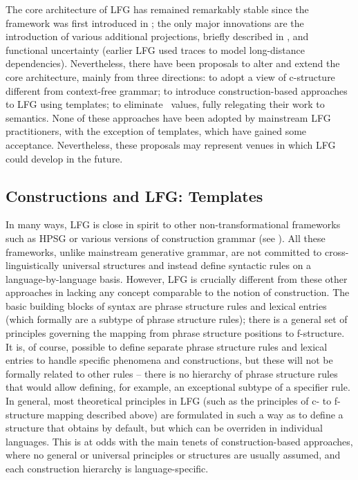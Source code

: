 \documentclass[output=paper,hidelinks]{langscibook}
\begin{document}
 The core architecture of LFG has remained remarkably stable since the framework was first introduced in \textcite{bresnan1982control-complementation}; the only major innovations are the introduction of various additional projections, briefly described in , and functional uncertainty (earlier LFG used traces to model long-distance dependencies). Nevertheless, there have been proposals to alter and extend the core architecture, mainly from three directions: to adopt a view of c-structure different from context-free grammar; to introduce construction-based approaches to LFG using templates; to eliminate \PRED\ values, fully relegating their work to semantics. None of these approaches have been adopted by mainstream LFG practitioners, with the exception of templates, which have gained some acceptance. Nevertheless, these proposals may represent venues in which LFG could develop in the future.

 \subsection{Constructions and LFG: Templates}\label{sec:CoreConcepts:templates}

 In many ways, LFG is close in spirit to other non-transformational frameworks such as HPSG \parencite{pollard1994head-driven} or various versions of construction grammar (see \cite{HoffmannTrousdale2013}). All these frameworks, unlike mainstream generative grammar, are not committed to cross-linguistically universal structures and instead define syntactic rules on a language-by-language basis. However, LFG is crucially different from these other approaches in lacking any concept comparable to the notion of construction. The basic building blocks of syntax are phrase structure rules and lexical entries (which formally are a subtype of phrase structure rules); there is a general set of principles governing the mapping from phrase structure positions to f-structure. It is, of course, possible to define separate phrase structure rules and lexical entries to handle specific phenomena and constructions, but these will not be formally related to other rules -- there is no hierarchy of phrase structure rules that would allow defining, for example, an exceptional subtype of a specifier rule. In general, most theoretical principles in LFG (such as the principles of c- to f-structure mapping described above) are formulated in such a way as to define a structure that obtains by default, but which can be overriden in individual languages. This is at odds with the main tenets of construction-based approaches, where no general or universal principles or structures are usually assumed, and each construction hierarchy is language-specific.
 
\end{document}
